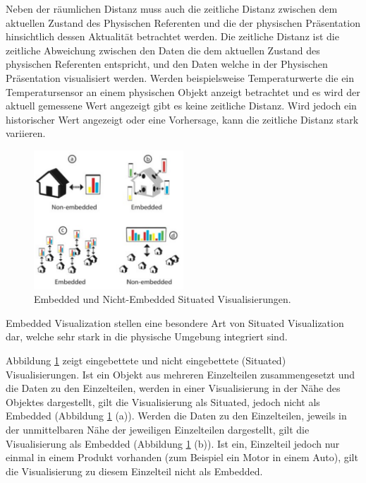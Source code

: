 \cite{Willett2017} Neben der räumlichen Distanz muss auch die zeitliche Distanz zwischen dem aktuellen Zustand des Physischen Referenten und die der physischen Präsentation hinsichtlich dessen 
Aktualität betrachtet werden. 
Die zeitliche Distanz ist die zeitliche Abweichung zwischen den Daten die dem aktuellen Zustand des physischen Referenten entspricht, und den Daten welche in der Physischen Präsentation visualisiert werden.
Werden beispielsweise Temperaturwerte die ein Temperatursensor an einem physischen Objekt anzeigt betrachtet und es wird der aktuell gemessene Wert angezeigt gibt es keine zeitliche Distanz. Wird jedoch ein
historischer Wert angezeigt oder eine Vorhersage, kann die zeitliche Distanz stark variieren.

\begin{figure}[H]
	\centering
	\includegraphics[width=0.5\textwidth]{resources/fundamentals/situated_visualization/embedded_visualization.png}
	\caption{Embedded und Nicht-Embedded Situated Visualisierungen. \cite[S.~195]{Marriott2018}}
	\label{img:embedded_visualization}
\end{figure}

\cite[S.~195]{Marriott2018} Embedded Visualization stellen eine besondere Art von Situated Visualization dar, welche sehr stark in die physische Umgebung integriert sind. 

Abbildung \ref{img:embedded_visualization} zeigt eingebettete und nicht eingebettete (Situated) Visualisierungen. \cite[S.~202]{Marriott2018} Ist ein Objekt aus mehreren Einzelteilen 
zusammengesetzt und die Daten zu den Einzelteilen, werden in einer Visualisierung in der Nähe des Objektes dargestellt, gilt die Visualisierung als Situated, jedoch nicht als Embedded (Abbildung \ref{img:embedded_visualization} (a)).
Werden die Daten zu den Einzelteilen, jeweils in der unmittelbaren Nähe der jeweiligen Einzelteilen dargestellt, gilt die Visualisierung als Embedded (Abbildung \ref{img:embedded_visualization} (b)). Ist ein, Einzelteil jedoch nur einmal in einem Produkt vorhanden (zum Beispiel ein Motor in einem Auto), gilt die Visualisierung zu diesem Einzelteil nicht als Embedded. 

